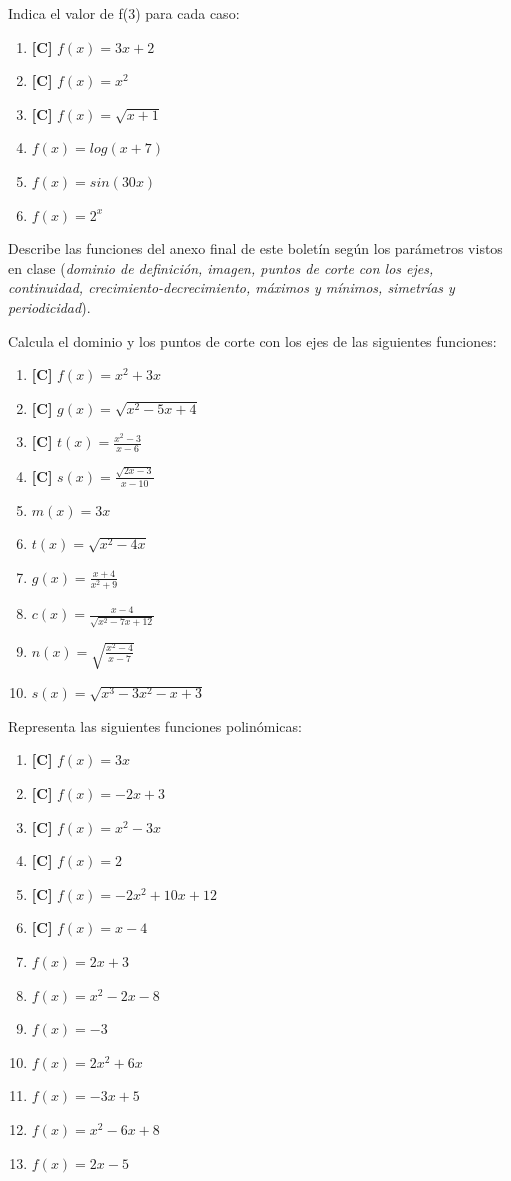 \Exercicio Indica el valor de f(3) para cada caso:

\begin{enumerate}[topsep=0pt]
	\item \textbf{[C]} $ f(x) = 3x + 2 $
	\item \textbf{[C]} $ f(x) = x^2 $
	\item \textbf{[C]} $ f(x) = \sqrt{x + 1} $
	\item $f(x) = log(x+7)$
	\item $f(x) = sin(30x)$
	\item $f(x) = 2^x$
\end{enumerate}


\Exercicio Describe las funciones del anexo final de este boletín según los parámetros vistos en clase (\textit{dominio de definición, imagen, puntos de corte con los ejes, continuidad, crecimiento-decrecimiento, máximos y mínimos, simetrías y periodicidad}).

\Exercicio Calcula el dominio y los puntos de corte con los ejes de las siguientes funciones:

\begin{enumerate}[topsep=0pt]
	\item \textbf{[C]} $f(x) = x^2 + 3x$
	\item \textbf{[C]} $g(x) = \sqrt{x^2 - 5x + 4} $
	\item \textbf{[C]} $t(x) = \frac{x^2- 3}{x - 6}$
	\item \textbf{[C]} $s(x) = \frac{\sqrt{2x-3}}{x-10}$
	\item $m(x)= 3x$
	\item $t(x) = \sqrt{x^2 - 4x}$
	\item $g(x) = \frac{x+ 4}{x^2+9}$
	\item $c(x) = \frac{x-4}{\sqrt{x^2-7x+12}}$
	\item $n(x) = \sqrt{\frac{x^2 -4}{x-7}}$
	\item $s(x) = \sqrt{x^3-3x^2-x+3}$
\end{enumerate}


\Exercicio Representa las siguientes funciones polinómicas:

\begin{enumerate}[topsep=0pt]
\item \textbf{[C]} $f(x) = 3x$
	\item \textbf{[C]} $f(x) = -2x + 3$
	\item \textbf{[C]} $f(x) = x^2 - 3x$
	\item \textbf{[C]} $f(x) = 2$
	\item \textbf{[C]} $f(x) = -2x^2 +10x + 12$
	\item \textbf{[C]} $f(x) = x - 4$
	\item  $f(x) = 2x +3$
	\item  $f(x) = x^2 - 2x - 8$
	\item  $f(x) = -3$
	\item  $f(x) = 2x^2 + 6x$
	\item  $f(x) = -3x + 5$
	\item  $f(x) = x^2 -6x + 8$
	\item  $f(x) = 2x - 5$
\end{enumerate}


